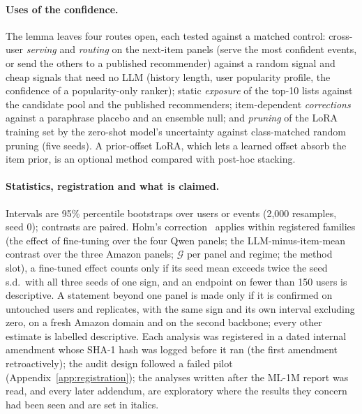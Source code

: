 \paragraph{Uses of the confidence.}
The lemma leaves four routes open, each tested against a matched control: cross-user \emph{serving} and \emph{routing} on the next-item
panels (serve the most confident events, or send the others to a published recommender) against a random signal and cheap signals that
need no LLM (history length, user popularity profile, the confidence of a popularity-only ranker); static \emph{exposure} of the top-10
lists against the candidate pool and the published recommenders; item-dependent \emph{corrections} against a paraphrase placebo and an
ensemble null; and \emph{pruning} of the LoRA training set by the zero-shot model's uncertainty against class-matched random pruning
(five seeds). A prior-offset LoRA, which lets a learned offset absorb the item prior, is an optional method compared with post-hoc
stacking.

\paragraph{Statistics, registration and what is claimed.}
Intervals are 95\% percentile bootstraps over users or events (2,000 resamples, seed 0); contrasts are paired. Holm's
correction~\citep{holm1979simple} applies within registered families (the effect of fine-tuning over the four Qwen panels; the
LLM-minus-item-mean contrast over the three Amazon panels; $\mathcal G$ per panel and regime; the method slot), a fine-tuned effect
counts only if its seed mean exceeds twice the seed s.d.\ with all three seeds of one sign, and an endpoint on fewer than 150 users is
descriptive. A statement beyond one panel is made only if it is confirmed on untouched users and replicates, with the same sign and
its own interval excluding zero, on a fresh Amazon domain and on the second backbone; every other estimate is labelled descriptive.
Each analysis was registered in a dated internal amendment whose SHA-1 hash was logged before it ran (the first amendment
retroactively); the audit design followed a failed pilot (Appendix~\ref{app:registration}); the analyses written after the ML-1M
report was read, and every later addendum, are exploratory where the results they concern had been seen and are set in italics.

